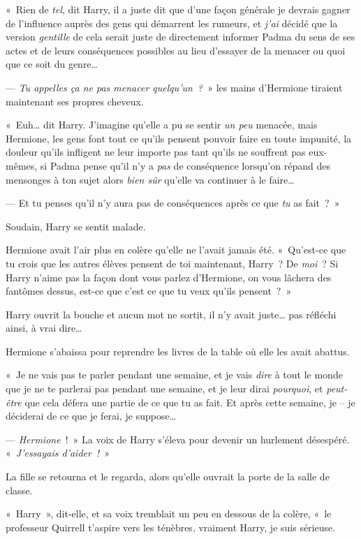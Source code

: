 «~Rien de \emph{tel}, dit Harry, il a juste dit que d'une façon générale je devrais gagner de l'influence auprès des gens qui démarrent les rumeurs, et \emph{j'ai} décidé que la version \emph{gentille} de cela serait juste de directement informer Padma du sens de ses actes et de leurs conséquences possibles au lieu d'essayer de la menacer ou quoi que ce soit du genre…

--- \emph{Tu appelles ça ne pas menacer quelqu'un~?}~» les mains d'Hermione tiraient maintenant ses propres cheveux.

«~Euh… dit Harry. J'imagine qu'elle a pu se sentir \emph{un peu} menacée, mais Hermione, les gens font tout ce qu'ils pensent pouvoir faire en toute impunité, la douleur qu'ils infligent ne leur importe pas tant qu'ils ne souffrent pas eux-mêmes, si Padma pense qu'il n'y a \emph{pas} de conséquence lorsqu'on répand des mensonges à ton sujet alors \emph{bien sûr} qu'elle va continuer à le faire…

--- Et tu penses qu'il n'y aura pas de conséquences après ce que \emph{tu} as fait~?~»

Soudain, Harry se sentit malade.

Hermione avait l'air plus en colère qu'elle ne l'avait jamais été. «~Qu'est-ce que tu crois que les autres élèves pensent de toi maintenant, Harry~? De \emph{moi}~? Si Harry n'aime pas la façon dont vous parlez d'Hermione, on vous lâchera des fantômes dessus, est-ce que c'est ce que tu veux qu'ils pensent~?~»

Harry ouvrit la bouche et aucun mot ne sortit, il n'y avait juste… pas réfléchi ainsi, à vrai dire…

Hermione s'abaissa pour reprendre les livres de la table où elle les avait abattus.

«~Je ne vais pas te parler pendant une semaine, et je vais \emph{dire} à tout le monde que je ne te parlerai pas pendant une semaine, et je leur dirai \emph{pourquoi}, et \emph{peut-être} que cela défera une partie de ce que tu as fait. Et après cette semaine, je -- je déciderai de ce que je ferai, je suppose…

--- \emph{Hermione}~!~» La voix de Harry s'éleva pour devenir un hurlement désespéré. «~\emph{J'essayais d'aider~!}~»

La fille se retourna et le regarda, alors qu'elle ouvrait la porte de la salle de classe.

«~Harry~», dit-elle, et sa voix tremblait un peu en dessous de la colère, «~le professeur Quirrell t'aspire vers les ténèbres, vraiment Harry, je suis sérieuse.

